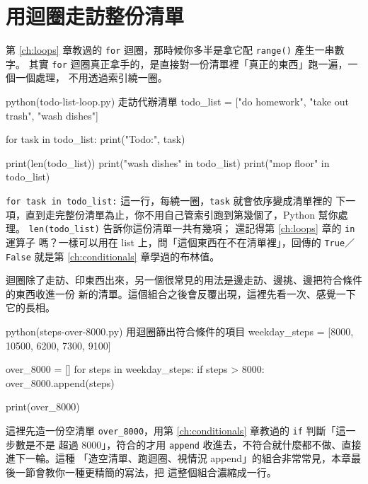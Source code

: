 \section{用迴圈走訪整份清單}
\label{sec:list-loop}

第 \ref{ch:loops} 章教過的 \texttt{for} 迴圈，那時候你多半是拿它配 \texttt{range()} 產生一串數字。
其實 \texttt{for} 迴圈真正拿手的，是直接對一份清單裡「真正的東西」跑一遍，一個一個處理，
不用透過索引繞一圈。

\begin{example}{python}{(todo-list-loop.py) 走訪代辦清單}
todo_list = ["do homework", "take out trash", "wash dishes"]

for task in todo_list:
    print("Todo:", task)

print(len(todo_list))
print("wash dishes" in todo_list)
print("mop floor" in todo_list)
\end{example}


\texttt{for task in todo\_list:} 這一行，每繞一圈，\texttt{task} 就會依序變成清單裡的
下一項，直到走完整份清單為止，你不用自己管索引跑到第幾個了，Python 幫你處理。
\texttt{len(todo\_list)} 告訴你這份清單一共有幾項；
還記得第 \ref{ch:loops} 章的 \texttt{in} 運算子
嗎？一樣可以用在 list 上，問「這個東西在不在清單裡」，回傳的 \texttt{True}／\texttt{False}
就是第 \ref{ch:conditionals} 章學過的布林值。

迴圈除了走訪、印東西出來，另一個很常見的用法是邊走訪、邊挑、邊把符合條件的東西收進一份
新的清單。這個組合之後會反覆出現，這裡先看一次、感覺一下它的長相。

\begin{example}{python}{(steps-over-8000.py) 用迴圈篩出符合條件的項目}
weekday_steps = [8000, 10500, 6200, 7300, 9100]

over_8000 = []
for steps in weekday_steps:
    if steps > 8000:
        over_8000.append(steps)

print(over_8000)
\end{example}

\iosample{}{[10500, 9100] \\}

這裡先造一份空清單 \texttt{over\_8000}，用第 \ref{ch:conditionals} 章教過的 \texttt{if} 判斷「這一步數是不是
超過 8000」，符合的才用 \texttt{append} 收進去，不符合就什麼都不做、直接進下一輪。這種
「造空清單、跑迴圈、視情況 append」的組合非常常見，本章最後一節會教你一種更精簡的寫法，把
這整個組合濃縮成一行。

